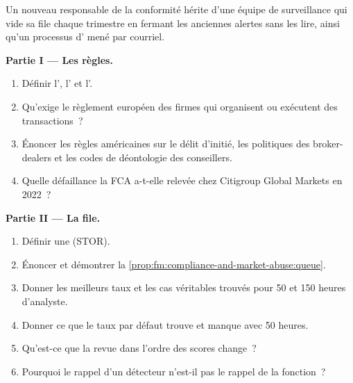 \begin{problem}\label{pb:fm:compliance-and-market-abuse:1}
Un nouveau responsable de la conformité hérite d'une équipe de surveillance qui vide sa file chaque trimestre en fermant les anciennes alertes sans les lire,
ainsi qu'un processus d' mené par courriel.

\medskip\noindent\textbf{Partie I --- Les règles.}
\begin{enumerate}
\item Définir l', l' et l'.
\item Qu'exige le règlement européen des firmes qui organisent ou exécutent des transactions~?
\item Énoncer les règles américaines sur le délit d'initié, les politiques des broker-dealers et les codes de déontologie des conseillers.
\item Quelle défaillance la FCA a-t-elle relevée chez Citigroup Global Markets en 2022~?
\end{enumerate}

\medskip\noindent\textbf{Partie II --- La file.}
\begin{enumerate}[resume]
\item Définir une  (STOR).
\item Énoncer et démontrer la \cref{prop:fm:compliance-and-market-abuse:queue}.
\item Donner les meilleurs taux et les cas véritables trouvés pour 50 et 150 heures d'analyste.
\item Donner ce que le taux par défaut trouve et manque avec 50 heures.
\item Qu'est-ce que la revue dans l'ordre des scores change~?
\item Pourquoi le rappel d'un détecteur n'est-il pas le rappel de la fonction~?
\end{enumerate}


\end{problem}
